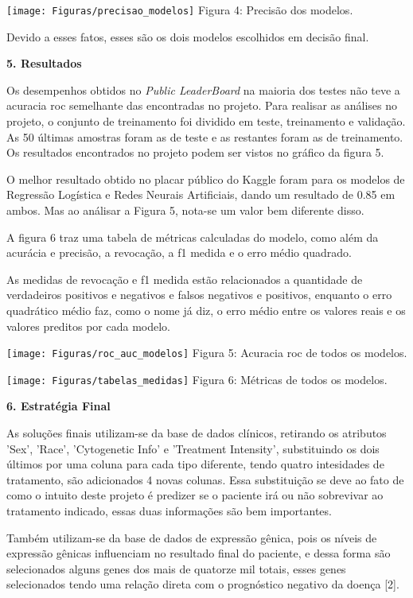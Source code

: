 \documentclass{article}
\begin{document}
\begin{multicols}{2}
\begin{center}
    \texttt{[image: Figuras/precisao\_modelos]}
    Figura 4: Precisão dos modelos.
\end{center}

Devido a esses fatos, esses são os dois modelos escolhidos em decisão final.

\textbf{5. Resultados}

Os desempenhos obtidos no \textit{Public LeaderBoard} na maioria dos testes não teve a acuracia roc semelhante das encontradas no projeto.
Para realisar as análises no projeto, o conjunto de treinamento foi dividido em teste, treinamento e validação.
As 50 últimas amostras foram as de teste e as restantes foram as de treinamento.
Os resultados encontrados no projeto podem ser vistos no gráfico da figura 5.

O melhor resultado obtido no placar público do Kaggle foram para os modelos de Regressão Logística e Redes Neurais Artificiais, dando um resultado de 0.85 em ambos. Mas ao análisar a Figura 5, nota-se um valor bem diferente disso.

A figura 6 traz uma tabela de métricas calculadas do modelo, como além da acurácia e precisão, a revocação, a f1 medida e o erro médio quadrado.

As medidas de revocação e f1 medida estão relacionados a quantidade de verdadeiros positivos e negativos e falsos negativos e positivos, enquanto o erro quadrático médio faz, como o nome já diz, o erro médio entre os valores reais e os valores preditos por cada modelo.
\begin{center}
    \texttt{[image: Figuras/roc\_auc\_modelos]}
    Figura 5: Acuracia roc de todos os modelos.

    \texttt{[image: Figuras/tabelas\_medidas]}
    Figura 6: Métricas de todos os modelos.
\end{center}

\textbf{6. Estratégia Final}

As soluções finais utilizam-se da base de dados clínicos, retirando os atributos 'Sex', 'Race', 'Cytogenetic Info' e 'Treatment Intensity', substituindo os dois últimos por uma coluna para cada tipo diferente, tendo quatro intesidades de tratamento, são adicionados 4 novas colunas.
Essa substituição se deve ao fato de como o intuito deste projeto é predizer se o paciente irá ou não sobrevivar ao tratamento indicado, essas duas informações são bem importantes.

Também utilizam-se da base de dados de expressão gênica, pois os níveis de expressão gênicas influenciam no resultado final do paciente, e dessa forma são selecionados alguns genes dos mais de quatorze mil totais, esses genes selecionados tendo uma relação direta com o prognóstico negativo da doença [2].


\end{multicols}
\end{document}
